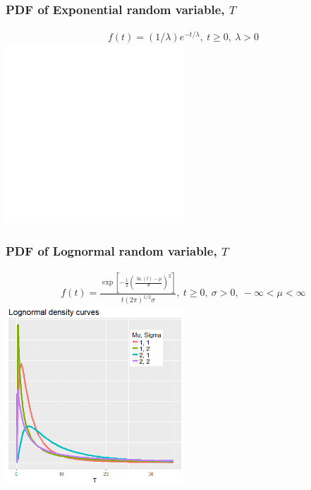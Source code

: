 \begin{frame}
\frametitle{PDF of Exponential random variable, $T$}
\begin{eqnarray}
f(t)=(1/\lambda)e^{-t/\lambda},~t \geq 0,~\lambda > 0 \nonumber
\end{eqnarray}
\includegraphics[width=0.50\textwidth]{Figures/exponential.png}
\end{frame}

\begin{frame}
\frametitle{PDF of Lognormal random variable, $T$}
\begin{eqnarray}
f(t)=\frac{\exp\left[ -\frac{1}{2}\left(\frac{\ln(t)-\mu}{\sigma} \right)^2 \right]}{t(2\pi)^{1/2}\sigma}, ~t \geq 0,~\sigma > 0,~ -\infty < \mu < \infty \nonumber
\end{eqnarray}
\includegraphics[width=0.50\textwidth]{Figures/lognormal.png}
\end{frame}

